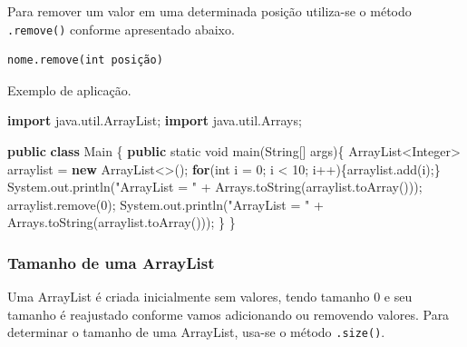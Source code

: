 \documentclass[
]{book}
\newenvironment{Shaded}{\begin{snugshade}}{\end{snugshade}}
\newcommand{\BuiltInTok}[1]{#1}
\newcommand{\DataTypeTok}[1]{\textcolor[rgb]{0.13,0.29,0.53}{#1}}
\newcommand{\DecValTok}[1]{\textcolor[rgb]{0.00,0.00,0.81}{#1}}
\newcommand{\FunctionTok}[1]{\textcolor[rgb]{0.00,0.00,0.00}{#1}}
\newcommand{\ImportTok}[1]{#1}
\newcommand{\KeywordTok}[1]{\textcolor[rgb]{0.13,0.29,0.53}{\textbf{#1}}}
\newcommand{\NormalTok}[1]{#1}
\newcommand{\StringTok}[1]{\textcolor[rgb]{0.31,0.60,0.02}{#1}}
\begin{document}
Para remover um valor em uma determinada posição utiliza-se o método \texttt{.remove()} conforme apresentado abaixo.

\begin{verbatim}
nome.remove(int posição)
\end{verbatim}

Exemplo de aplicação.

\begin{Shaded}
\begin{Highlighting}[]
\KeywordTok{import}\ImportTok{ java.util.ArrayList;}
\KeywordTok{import}\ImportTok{ java.util.Arrays;}

\KeywordTok{public} \KeywordTok{class}\NormalTok{ Main \{}
    \KeywordTok{public} \DataTypeTok{static} \DataTypeTok{void} \FunctionTok{main}\NormalTok{(}\BuiltInTok{String}\NormalTok{[] args)\{}
        \BuiltInTok{ArrayList}\NormalTok{<}\BuiltInTok{Integer}\NormalTok{> arraylist = }\KeywordTok{new} \BuiltInTok{ArrayList}\NormalTok{<>();}
        \KeywordTok{for}\NormalTok{(}\DataTypeTok{int}\NormalTok{ i = }\DecValTok{0}\NormalTok{; i < }\DecValTok{10}\NormalTok{; i++)\{arraylist.}\FunctionTok{add}\NormalTok{(i);\}}
        \BuiltInTok{System}\NormalTok{.}\FunctionTok{out}\NormalTok{.}\FunctionTok{println}\NormalTok{(}\StringTok{"ArrayList = "}\NormalTok{ + }\BuiltInTok{Arrays}\NormalTok{.}\FunctionTok{toString}\NormalTok{(arraylist.}\FunctionTok{toArray}\NormalTok{()));}
\NormalTok{        arraylist.}\FunctionTok{remove}\NormalTok{(}\DecValTok{0}\NormalTok{);}
        \BuiltInTok{System}\NormalTok{.}\FunctionTok{out}\NormalTok{.}\FunctionTok{println}\NormalTok{(}\StringTok{"ArrayList = "}\NormalTok{ + }\BuiltInTok{Arrays}\NormalTok{.}\FunctionTok{toString}\NormalTok{(arraylist.}\FunctionTok{toArray}\NormalTok{()));}
\NormalTok{    \}}
\NormalTok{\}}
\end{Highlighting}
\end{Shaded}

\hypertarget{tamanho-de-uma-arraylist}{%
\subsubsection*{Tamanho de uma ArrayList}\label{tamanho-de-uma-arraylist}}

Uma ArrayList é criada inicialmente sem valores, tendo tamanho 0 e seu tamanho é reajustado conforme vamos adicionando ou removendo valores. Para determinar o tamanho de uma ArrayList, usa-se o método \texttt{.size()}.
\end{document}
